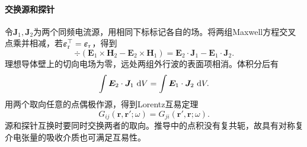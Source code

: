 \paragraph{交换源和探针}
令$\bm J_1,\bm J_2$为两个同频电流源，用相同下标标记各自的场。将两组Maxwell方程交叉点乘并相减，若$\bm\varepsilon_\mathrm r^\top = \bm\varepsilon_\mathrm r$，得到
\[
    \div(\bm E_1 \times \bm H_2 - \bm E_2 \times \bm H_1)
      = \bm E_2 \cdot \bm J_1 - \bm E_1 \cdot \bm J_2 .
\]
理想导体壁上的切向电场为零，远处两组外行波的表面项相消。体积分后有
\begin{equation}
    \label{eq:ed-lorentz-reciprocity-sources}
    \int\bm E_2 \cdot \bm J_1\,\mathop{}\!\mathrm{d} V = \int\bm E_1 \cdot \bm J_2\,\mathop{}\!\mathrm{d} V.
\end{equation}
用两个取向任意的点偶极作源，得到Lorentz互易定理
\begin{equation}
    G_{ij}(\bm r,\bm r';\omega) = G_{ji}(\bm r',\bm r;\omega).
\end{equation}
源和探针互换时要同时交换两者的取向。推导中的点积没有复共轭，故具有对称复介电张量的吸收介质也可满足互易性。

